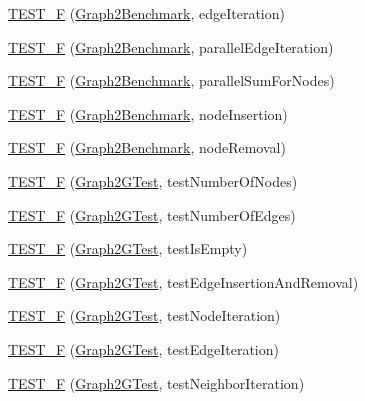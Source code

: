 \begin{DoxyCompactItemize}
\item 
\hyperlink{namespace_networ_kit_a4921bb3d2d4c7a7415bb0e4474543d62}{T\-E\-S\-T\-\_\-\-F} (\hyperlink{class_networ_kit_1_1_graph2_benchmark}{Graph2\-Benchmark}, edge\-Iteration)
\item 
\hyperlink{namespace_networ_kit_a4a4197d41cab8dc526b7b75c0deeaedd}{T\-E\-S\-T\-\_\-\-F} (\hyperlink{class_networ_kit_1_1_graph2_benchmark}{Graph2\-Benchmark}, parallel\-Edge\-Iteration)
\item 
\hyperlink{namespace_networ_kit_a6eb766d3a47181885b899b7d8f6ffba3}{T\-E\-S\-T\-\_\-\-F} (\hyperlink{class_networ_kit_1_1_graph2_benchmark}{Graph2\-Benchmark}, parallel\-Sum\-For\-Nodes)
\item 
\hyperlink{namespace_networ_kit_a14d70cf5024154e21fa9889eeda6958a}{T\-E\-S\-T\-\_\-\-F} (\hyperlink{class_networ_kit_1_1_graph2_benchmark}{Graph2\-Benchmark}, node\-Insertion)
\item 
\hyperlink{namespace_networ_kit_a5a01fa79b966fd0999b90b75b56e7d7b}{T\-E\-S\-T\-\_\-\-F} (\hyperlink{class_networ_kit_1_1_graph2_benchmark}{Graph2\-Benchmark}, node\-Removal)
\item 
\hyperlink{namespace_networ_kit_a68b5958ff9c52ac3f38f0cd54125ae99}{T\-E\-S\-T\-\_\-\-F} (\hyperlink{class_networ_kit_1_1_graph2_g_test}{Graph2\-G\-Test}, test\-Number\-Of\-Nodes)
\item 
\hyperlink{namespace_networ_kit_a1c5826f9d4dc45c864c2cd135e7e49aa}{T\-E\-S\-T\-\_\-\-F} (\hyperlink{class_networ_kit_1_1_graph2_g_test}{Graph2\-G\-Test}, test\-Number\-Of\-Edges)
\item 
\hyperlink{namespace_networ_kit_a5c7ec10a80327d1f725240dd250447cb}{T\-E\-S\-T\-\_\-\-F} (\hyperlink{class_networ_kit_1_1_graph2_g_test}{Graph2\-G\-Test}, test\-Is\-Empty)
\item 
\hyperlink{namespace_networ_kit_a15c2af1f595eb5507495a3d3a6cb88e5}{T\-E\-S\-T\-\_\-\-F} (\hyperlink{class_networ_kit_1_1_graph2_g_test}{Graph2\-G\-Test}, test\-Edge\-Insertion\-And\-Removal)
\item 
\hyperlink{namespace_networ_kit_a458b18e5bd29a405883b670653c58adf}{T\-E\-S\-T\-\_\-\-F} (\hyperlink{class_networ_kit_1_1_graph2_g_test}{Graph2\-G\-Test}, test\-Node\-Iteration)
\item 
\hyperlink{namespace_networ_kit_a2b00c6ce31fcd9521d405be57e2a84b4}{T\-E\-S\-T\-\_\-\-F} (\hyperlink{class_networ_kit_1_1_graph2_g_test}{Graph2\-G\-Test}, test\-Edge\-Iteration)
\item 
\hyperlink{namespace_networ_kit_a9f010b0003464134e388a613a6caf8dc}{T\-E\-S\-T\-\_\-\-F} (\hyperlink{class_networ_kit_1_1_graph2_g_test}{Graph2\-G\-Test}, test\-Neighbor\-Iteration)

\end{DoxyCompactItemize}
